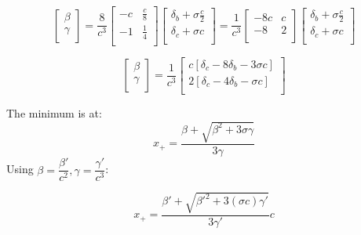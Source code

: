 \documentclass[aps,12pt]{revtex4}
\begin{document}
\begin{equation}
	\begin{bmatrix}
	\beta\\
	\gamma\\
\end{bmatrix}
= \dfrac{8}{c^3} 
\begin{bmatrix}
	-c & \frac{c}{8} \\
	-1 & \frac{1}{4} \\
\end{bmatrix}
\begin{bmatrix}
	\delta_b   + \sigma \frac{c}{2}\\
	\delta_c   + \sigma c\\
\end{bmatrix}
= \dfrac{1}{c^3} 
\begin{bmatrix}
	-8c & c \\
	-8  & 2 \\
\end{bmatrix}
\begin{bmatrix}
	\delta_b   + \sigma \frac{c}{2}\\
	\delta_c   + \sigma c\\
\end{bmatrix}
\end{equation}


\begin{equation}
	\begin{bmatrix}
	\beta\\
	\gamma\\
\end{bmatrix}
= \dfrac{1}{c^3} 
\begin{bmatrix}
	 c\left[\delta_c - 8\delta_b - 3 \sigma c \right]\\
	 2\left[\delta_c - 4\delta_b - \sigma c \right]\\
\end{bmatrix}
\end{equation}

The minimum is at:
\begin{equation}
	x_+ = \dfrac{\beta+\sqrt{\beta^2+3\sigma\gamma}}{3\gamma}
\end{equation}
Using $\beta=\dfrac{\beta'}{c^2},\gamma=\dfrac{\gamma'}{c^3}$:
 	 
\begin{equation}
	x_+ = \dfrac{\beta'+\sqrt{\beta'^2+3 (\sigma c) \gamma'}}{3\gamma'} c
\end{equation}
\end{document}
